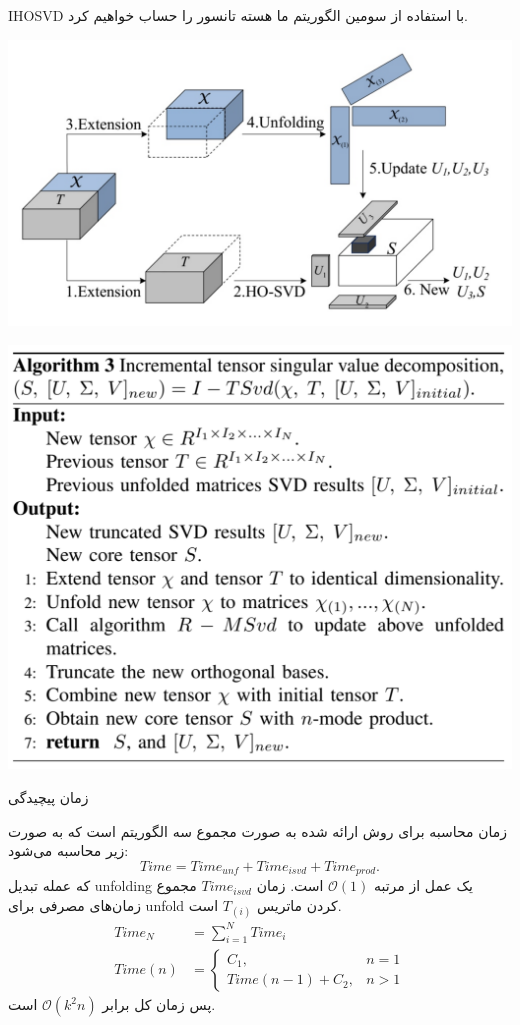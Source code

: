 \begin{frame}{IHOSVD}
با استفاده از سومین الگوریتم  ما هسته تانسور را حساب خواهیم کرد.

\pause
\begin{center}
	\includegraphics[width=.8\textwidth]{img/ok/AIHOSVD3.pdf}
\end{center}
\end{frame}
\begin{frame}
\begin{center}
	\includegraphics[width=.8\textwidth]{img/ok/AIHOSVD4.pdf}
\end{center}
\end{frame}
\begin{frame}{زمان پیچیدگی}
\small{
زمان محاسبه برای روش ارائه شده به صورت مجموع سه الگوریتم است که به صورت زیر محاسبه می‌شود:
\[Time=Time_{unf}+Time_{isvd}+Time_{prod}.\]
که عمله تبدیل unfolding  یک عمل از مرتبه 
$\mathcal{O}(1)$
است. زمان $Time_{isvd}$ مجموع زمان‌های مصرفی برای unfold کردن ماتریس $T_{(i)}$ است.
\begin{align*}
Time_N&=\sum_{i=1}^N Time_i\\
Time(n)&=\begin{cases}
C_1,&n=1\\
Time(n-1)+C_2,&n>1
\end{cases}
\end{align*}
پس زمان کل برابر $\mathcal{O}(k^2n)$ است.

}
\end{frame}